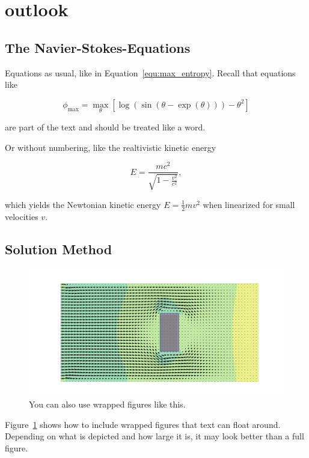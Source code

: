 \documentclass[11pt,table]{article}
\begin{document}
\section{outlook}

\subsection{The Navier-Stokes-Equations}

Equations as usual, like in Equation~\ref{equ:max_entropy}. Recall that equations like

\begin{equation}\label{equ:max_entropy}
	\phi_\mathrm{max} = \max_{\theta} \left[ \log(\sin(\theta - \exp(\theta))) - \theta^2 \right]
\end{equation}

are part of the text and should be treated like a word.


Or without numbering, like the realtivistic kinetic energy 

\begin{equation*}
	E = \frac{mc^2}{\sqrt{1 - \frac{v^2}{c^2}}},
\end{equation*}

which yields the Newtonian kinetic energy $E = \frac 1 2 m v^2$ when linearized for small velocities $v$.

\subsection{Solution Method}
\begin{figure}
	\centering
	\includegraphics[scale=1.0]{Figures/example_cover.png}
	\caption{You can also use wrapped figures like this.}
	\label{fig:wrapfigure_example}
\end{figure}
Figure~\ref{fig:wrapfigure_example} shows how to include wrapped figures that text can float around. Depending on what is depicted and how large it is, it may look better than a full figure.
\end{document}
